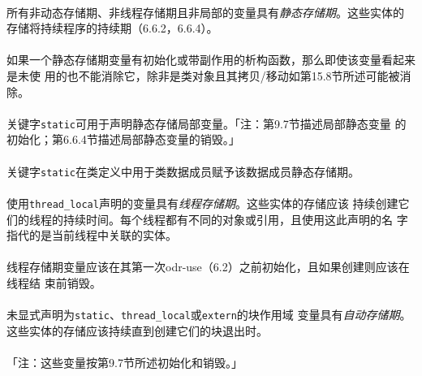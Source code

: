 
\paragraph{}
所有非动态存储期、非线程存储期且非局部的变量具有\textit{静态存储期}。这些实体的
存储将持续程序的持续期（6.6.2，6.6.4）。

\paragraph{}
如果一个静态存储期变量有初始化或带副作用的析构函数，那么即使该变量看起来是未使
用的也不能消除它，除非是类对象且其拷贝/移动如第15.8节所述可能被消除。

\paragraph{}
关键字\texttt{static}可用于声明静态存储局部变量。「注：第9.7节描述局部静态变量
的初始化；第6.6.4节描述局部静态变量的销毁。」

\paragraph{}
关键字\texttt{static}在类定义中用于类数据成员赋予该数据成员静态存储期。

\paragraph{}
使用\texttt{thread\_local}声明的变量具有\textit{线程存储期}。这些实体的存储应该
持续创建它们的线程的持续时间。每个线程都有不同的对象或引用，且使用这此声明的名
字指代的是当前线程中关联的实体。

\paragraph{}
线程存储期变量应该在其第一次odr-use（6.2）之前初始化，且如果创建则应该在线程结
束前销毁。

\paragraph{}
未显式声明为\texttt{static}、\texttt{thread\_local}或\texttt{extern}的块作用域
变量具有\textit{自动存储期}。这些实体的存储应该持续直到创建它们的块退出时。

\paragraph{}
「注：这些变量按第9.7节所述初始化和销毁。」

